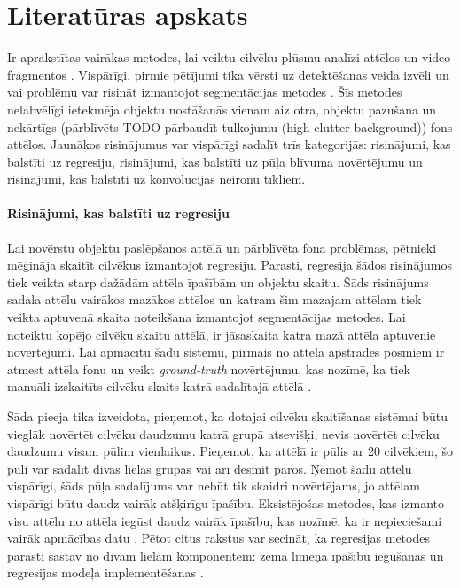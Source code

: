 \chapter{Literatūras apskats}

Ir aprakstītas vairākas metodes, lai veiktu cilvēku plūsmu analīzi attēlos un video fragmentos \cite{brostow2006unsupervised,chen2013cumulative,ge2009marked,chen2015person,lempitsky2010learning}. Vispārīgi, pirmie pētījumi tika vērsti uz detektēšanas veida izvēli un vai problēmu var risināt izmantojot segmentācijas metodes \cite{tu2008unified}. Šīs metodes nelabvēlīgi ietekmēja objektu nostāšanās vienam aiz otra, objektu pazušana un nekārtīgs (pārblīvēts TODO pārbaudīt tulkojumu (high clutter background)) fons attēlos. Jaunākos risinājumus var vispārīgi sadalīt trīs kategorijās: risinājumi, kas balstīti uz regresiju, risinājumi, kas balstīti uz pūļa blīvuma novērtējumu un risinājumi, kas balstīti uz konvolūcijas neironu tīkliem. 

\subsubsection{Risinājumi, kas balstīti uz regresiju}
Lai novērstu objektu paslēpšanos attēlā un pārblīvēta fona problēmas, pētnieki mēģināja skaitīt cilvēkus izmantojot regresiju. Parasti, regresija šādos risinājumos tiek veikta starp dažādām attēla īpašībām un objektu skaitu. Šāds risinājums sadala attēlu vairākos mazākos attēlos un katram šim mazajam attēlam tiek veikta aptuvenā skaita noteikšana izmantojot segmentācijas metodes. Lai noteiktu kopējo cilvēku skaitu attēlā, ir jāsaskaita katra mazā attēla aptuvenie novērtējumi. Lai apmācītu šādu sistēmu, pirmais no attēla apstrādes posmiem ir atmest attēla fonu un veikt \textit{ground-truth} novērtējumu, kas nozīmē, ka tiek manuāli izskaitīts cilvēku skaits katrā sadalītajā attēlā  \cite{chan2009bayesian,ryan2009crowd,chen2012feature}.

Šāda pieeja tika izveidota, pieņemot, ka dotajai cilvēku skaitīšanas sistēmai būtu vieglāk novērtēt cilvēku daudzumu katrā grupā atsevišķi, nevis novērtēt cilvēku daudzumu visam pūlim vienlaikus. Pieņemot, ka attēlā ir pūlis ar 20 cilvēkiem, šo pūli var sadalīt divās lielās grupās vai arī desmit pāros. Ņemot šādu attēlu vispārīgi, šāds pūļa sadalījums var nebūt tik skaidri novērtējams, jo attēlam vispārīgi būtu daudz vairāk atšķirīgu īpašību. Eksistējošas metodes, kas izmanto visu attēlu no attēla iegūst daudz vairāk īpašību, kas nozīmē, ka ir nepieciešami vairāk apmācības datu \cite{chan2008privacy}. Pētot citus rakstus var secināt, ka regresijas metodes parasti sastāv no divām lielām komponentēm: zema līmeņa īpašību iegūšanas un regresijas modeļa implementēšanas \cite{xiong2017spatiotemporal}. 

